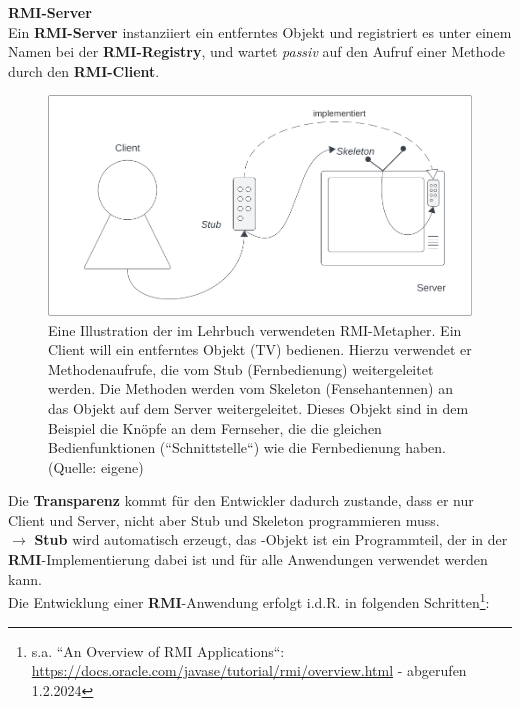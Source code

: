 \begin{tcolorbox}
    \noindent
    \textbf{RMI-Server}\\
    Ein \textbf{RMI-Server} instanziiert ein entferntes Objekt und registriert es unter einem Namen bei der \textbf{RMI-Registry}, und wartet \textit{passiv} auf den Aufruf einer Methode durch den \textbf{RMI-Client}.

\end{tcolorbox}

\begin{figure}
    \centering
    \includegraphics[scale=0.35]{chapters/fopt5/img/rmi/tv}
    \caption{Eine Illustration der im Lehrbuch verwendeten RMI-Metapher. Ein Client will ein entferntes Objekt (TV) bedienen. Hierzu verwendet er Methodenaufrufe, die vom Stub (Fernbedienung) weitergeleitet werden. Die Methoden werden vom Skeleton (Fensehantennen) an das Objekt auf dem Server weitergeleitet. Dieses Objekt sind in dem Beispiel die Knöpfe an dem Fernseher, die die gleichen Bedienfunktionen (``Schnittstelle``) wie die Fernbedienung haben. (Quelle: eigene)}
    \label{fig:tv}
\end{figure}

\noindent
Die \textbf{Transparenz} kommt für den Entwickler dadurch zustande, dass er nur Client und Server, nicht aber Stub und Skeleton programmieren muss.\\
$\rightarrow$ \textbf{Stub} wird automatisch erzeugt, das -Objekt ist ein Programmteil, der in der \textbf{RMI}-Implementierung dabei ist und für alle Anwendungen verwendet werden kann.\\

\noindent
Die Entwicklung einer \textbf{RMI}-Anwendung erfolgt i.d.R. in folgenden Schritten\footnote{
s.a. ``An Overview of RMI Applications``: \url{https://docs.oracle.com/javase/tutorial/rmi/overview.html} - abgerufen 1.2.2024
}:

